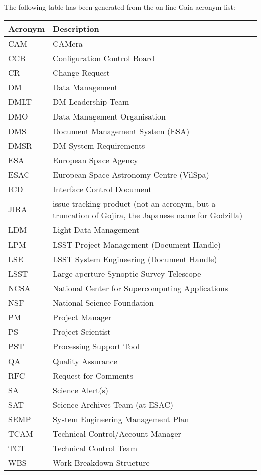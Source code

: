 The following table has been generated from the on-line Gaia acronym list:
\newline\newline%
\addtocounter{table}{-1}
\begin{longtable}{|l|p{}|}\hline 
\textbf{Acronym} & \textbf{Description}  \\\hline
CAM&CAMera \\\hline
CCB&Configuration Control Board \\\hline
CR&Change Request \\\hline
DM&Data Management \\\hline
DMLT&DM Leadership Team \\\hline
DMO&Data Management Organisation \\\hline
DMS&Document Management System (ESA) \\\hline
DMSR&DM System Requirements \\\hline
ESA&European Space Agency \\\hline
ESAC&European Space Astronomy Centre (VilSpa) \\\hline
ICD&Interface Control Document \\\hline
JIRA&issue tracking product (not an acronym, but a truncation of Gojira, the Japanese name for Godzilla) \\\hline
LDM&Light Data Management \\\hline
LPM&LSST Project Management (Document Handle) \\\hline
LSE&LSST System Engineering (Document Handle) \\\hline
LSST&Large-aperture Synoptic Survey Telescope \\\hline
NCSA&National Center for Supercomputing Applications \\\hline
NSF&National Science Foundation \\\hline
PM&Project Manager \\\hline
PS&Project Scientist \\\hline
PST&Processing Support Tool \\\hline
QA&Quality Assurance \\\hline
RFC&Request for Comments \\\hline
SA&Science Alert(s) \\\hline
SAT&Science Archives Team (at ESAC) \\\hline
SEMP&System Engineering Management Plan \\\hline
TCAM&Technical Control/Account Manager \\\hline
TCT&Technical Control Team \\\hline
WBS&Work Breakdown Structure \\\hline
\end{longtable} 
